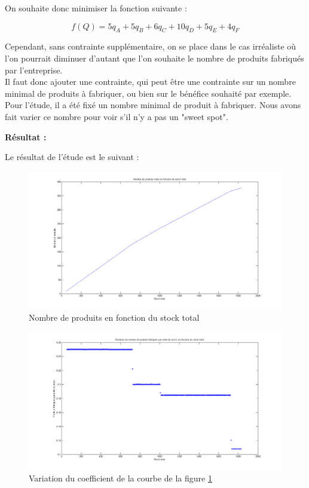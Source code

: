 \documentclass[paper=a4, fontsize=11pt]{scrartcl}
\numberwithin{equation}{section}		%
\numberwithin{figure}{section}			%
\numberwithin{table}{section}				%
\renewcommand{\bf}[1]{\textbf{#1}}
\begin{document}
On souhaite donc minimiser la fonction suivante : 

\[ f(Q) = 5q_A + 5q_B + 6q_C + 10q_D + 5q_E + 4q_F \]

Cependant, sans contrainte supplémentaire, on se place dans le cas irréaliste où l'on pourrait diminuer d'autant que l'on souhaite le nombre de produits fabriqués par l'entreprise.\\
Il faut donc ajouter une contrainte, qui peut être une contrainte sur un nombre minimal de produits à fabriquer, ou bien sur le bénéfice souhaité par exemple.\\
Pour l'étude, il a été fixé un nombre minimal de produit à fabriquer. Nous avons fait varier ce nombre pour voir s'il n'y a pas un "sweet spot".

\bf{Résultat :}

Le résultat de l'étude est le suivant : 

\begin{figure}[H]
\caption{Nombre de produits en fonction du stock total \label{figstock}}
\centering
\includegraphics[width=16cm]{figures/nbProduitsFctStockTotal.png}
\end{figure}

\begin{figure}[H]
\caption{Variation du coefficient de la courbe de la figure \ref{figstock}}
\centering
\includegraphics[width=16cm]{figures/nbProduitsFctStockTotal_Coeff.png}
\end{figure}
\end{document}

